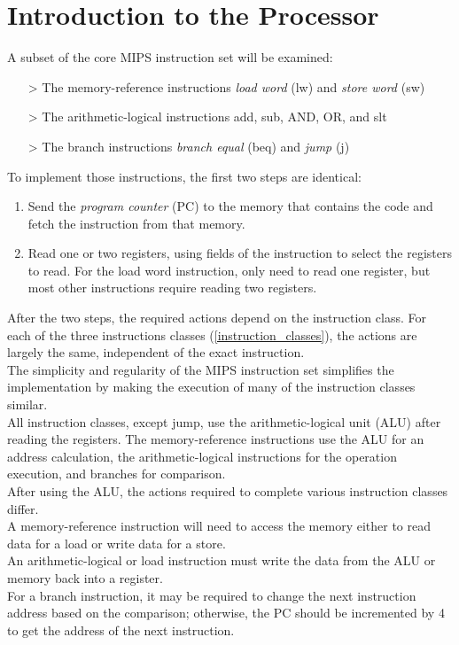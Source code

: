 \documentclass[12pt]{article}
\theoremstyle{definition}
\begin{document}
  \section{Introduction to the Processor}
  A subset of the core MIPS instruction set will be examined:
  \begin{enumerate} \label{instruction_classes}
    \item[>] The memory-reference instructions \emph{load word} (lw) and \emph{store word} (sw)
    \item[>] The arithmetic-logical instructions add, sub, AND, OR, and slt
    \item[>] The branch instructions \emph{branch equal} (beq) and \emph{jump} (j)
  \end{enumerate}
  To implement those instructions, the first two steps are identical:
  \begin{enumerate}
    \item Send the \emph{program counter} (PC) to the memory that contains the code and fetch the instruction from that memory.
    \item Read one or two registers, using fields of the instruction to select the registers to read. For the load word instruction, only need to read one register, but most other instructions require reading two registers.
  \end{enumerate}
  After the two steps, the required actions depend on the instruction class.
  For each of the three instructions classes (\ref{instruction_classes}), the actions are largely the same, independent of the exact instruction. \\
  The simplicity and regularity of the MIPS instruction set simplifies the implementation by making the execution of many of the instruction classes similar. \\

  All instruction classes, except jump, use the arithmetic-logical unit (ALU) after reading the registers.
  The memory-reference instructions use the ALU for an address calculation, the arithmetic-logical instructions for the operation execution, and branches for comparison. \\
  After using the ALU, the actions required to complete various instruction classes differ. \\
  A memory-reference instruction will need to access the memory either to read data for a load or write data for a store. \\
  An arithmetic-logical or load instruction must write the data from the ALU or memory back into a register. \\
  For a branch instruction, it may be required to change the next instruction address based on the comparison; otherwise, the PC should be incremented by 4 to get the address of the next instruction.
\end{document}
